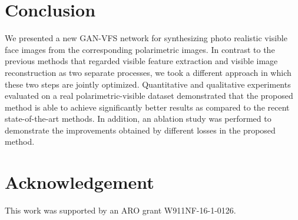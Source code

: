 \documentclass[10pt,twocolumn,letterpaper]{article}
\begin{document}
\begin{table}[htp!]
\centering
\caption{The average EER and AUC results corresponding to different methods.}
\label{err}
\end{table}

\section{Conclusion}
	We presented a new GAN-VFS network for synthesizing photo realistic visible face images from the  corresponding polarimetric images. In contrast to the previous methods that regarded visible feature extraction and visible image reconstruction as two separate processes, we took a different approach in which these two steps are jointly optimized. 	Quantitative and qualitative experiments  evaluated on a real polarimetric-visible dataset demonstrated that the proposed method is able to achieve significantly better results as compared to the recent state-of-the-art methods. In addition, an ablation study was performed to demonstrate the improvements obtained by different losses in the proposed method. 




\section*{Acknowledgement}
 This work was supported by an ARO grant W911NF-16-1-0126.
 

{\small


}
\end{document}
